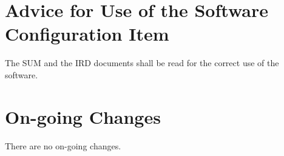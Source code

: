
\chapter{Advice for Use of the Software Configuration Item}

The SUM and the IRD documents shall be read for the correct use of the software. 

\chapter{On-going Changes}

There are no on-going changes.